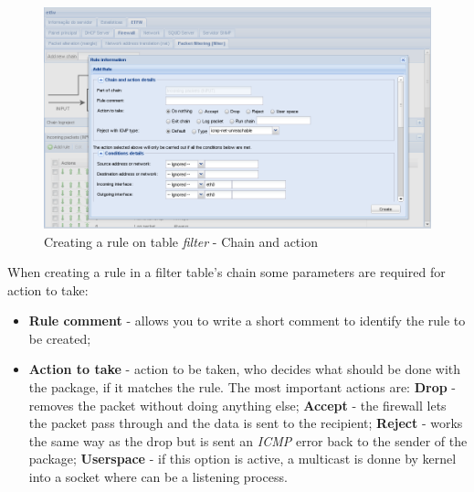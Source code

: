 \begin{figure}[H]
    \begin{center}
    \includegraphics[scale=0.38]{screenshots/etfw/etfw_firewall_02.png}
    \caption{Creating a rule on table \textit{filter} - Chain and action}
    \label{fig:etfw_firewall_02}
    \end{center}
\end{figure}

When creating a rule in a filter table's chain some parameters are required for action to take:

\begin{itemize}
   \item \textbf{Rule comment} - allows you to write a short comment to identify the rule to be created;
   \item \textbf{Action to take} - action to be taken, who decides what should be done with the package, if it matches the rule. The most important actions are:
       \subitem \textbf{Drop} - removes the packet without doing anything else;
       \subitem \textbf{Accept} - the firewall lets the packet pass through and the data is sent to the recipient;
       \subitem \textbf{Reject} - works the same way as the drop but is sent an \textit {ICMP} error back to the sender of the package;
       \subitem \textbf{Userspace} - if this option is active, a multicast is donne by kernel into a socket where can be a listening process.
\end{itemize}

